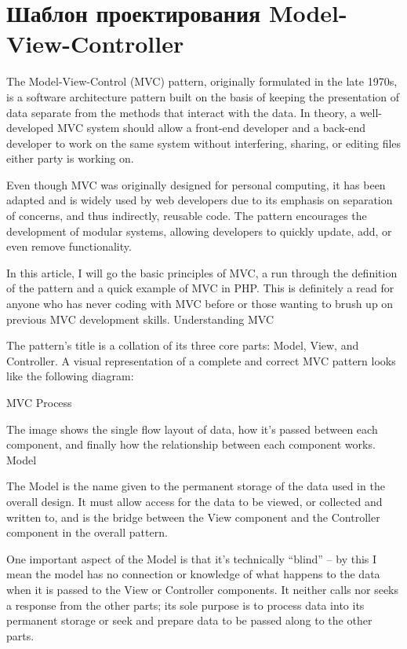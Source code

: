 \documentclass[a4paper,openany,twoside,draft]{book}
\begin{document}
\section{Шаблон проектирования Model-View-Controller}
\label{sec:MVC}

The Model-View-Control (MVC) pattern, originally formulated in the late 1970s, is a software architecture pattern built on the basis of keeping the presentation of data separate from the methods that interact with the data. In theory, a well-developed MVC system should allow a front-end developer and a back-end developer to work on the same system without interfering, sharing, or editing files either party is working on.

Even though MVC was originally designed for personal computing, it has been adapted and is widely used by web developers due to its emphasis on separation of concerns, and thus indirectly, reusable code. The pattern encourages the development of modular systems, allowing developers to quickly update, add, or even remove functionality.

In this article, I will go the basic principles of MVC, a run through the definition of the pattern and a quick example of MVC in PHP. This is definitely a read for anyone who has never coding with MVC before or those wanting to brush up on previous MVC development skills.
Understanding MVC

The pattern’s title is a collation of its three core parts: Model, View, and Controller. A visual representation of a complete and correct MVC pattern looks like the following diagram:

MVC Process

The image shows the single flow layout of data, how it’s passed between each component, and finally how the relationship between each component works.
Model

The Model is the name given to the permanent storage of the data used in the overall design. It must allow access for the data to be viewed, or collected and written to, and is the bridge between the View component and the Controller component in the overall pattern.

One important aspect of the Model is that it’s technically “blind” – by this I mean the model has no connection or knowledge of what happens to the data when it is passed to the View or Controller components. It neither calls nor seeks a response from the other parts; its sole purpose is to process data into its permanent storage or seek and prepare data to be passed along to the other parts.
\end{document}
